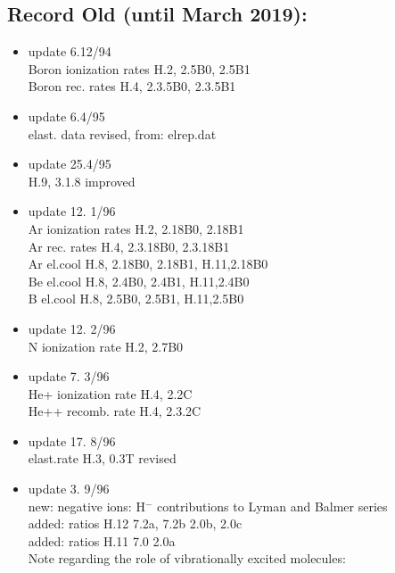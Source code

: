 \documentclass[12pt,dvipdfmx]{article}
\begin{document}
\subsection{Record Old (until March 2019):}\label{record_old}
\begin{itemize}
\item update  6.12/94 \\
   Boron ionization rates H.2, 2.5B0, 2.5B1 \\
                           Boron rec.   rates H.4, 2.3.5B0, 2.3.5B1 \\
 \item update  6.4/95 \\
  elast. data revised, from: elrep.dat \\
 \item update  25.4/95 \\
  H.9, 3.1.8 improved   \\
 \item update 12. 1/96 \\
   Ar ionization rates H.2, 2.18B0, 2.18B1   \\
   Ar rec.   rates H.4, 2.3.18B0, 2.3.18B1 \\
   Ar el.cool      H.8, 2.18B0, 2.18B1, H.11,2.18B0\\
   Be  el.cool      H.8, 2.4B0, 2.4B1, H.11,2.4B0\\
   B   el.cool      H.8, 2.5B0, 2.5B1, H.11,2.5B0\\
 \item update 12. 2/96 \\
   N ionization rate H.2, 2.7B0 \\
 \item update  7. 3/96 \\
   He+ ionization rate H.4, 2.2C \\
   He++ recomb. rate H.4, 2.3.2C \\
 \item update  17. 8/96 \\
   elast.rate H.3, 0.3T revised
 \item update   3. 9/96 \\
 new: negative ions: H$^-$ contributions to Lyman and Balmer series\\
   added: ratios H.12 7.2a, 7.2b 2.0b, 2.0c\\
   added: ratios H.11 7.0 2.0a\\

Note regarding the role of vibrationally excited molecules:


\end{itemize}
\end{document}
